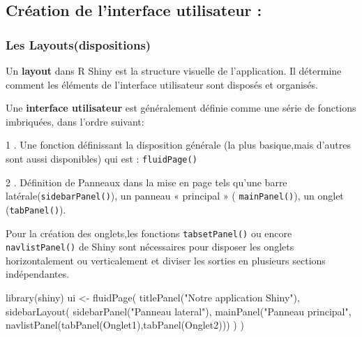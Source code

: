 \documentclass[
]{article}
\newenvironment{Shaded}{\begin{snugshade}}{\end{snugshade}}
\newcommand{\FunctionTok}[1]{\textcolor[rgb]{0.00,0.00,0.00}{#1}}
\newcommand{\NormalTok}[1]{#1}
\newcommand{\OtherTok}[1]{\textcolor[rgb]{0.56,0.35,0.01}{#1}}
\newcommand{\StringTok}[1]{\textcolor[rgb]{0.31,0.60,0.02}{#1}}
\begin{document}
\hypertarget{cruxe9ation-de-linterface-utilisateur}{%
\subsection{Création de l'interface utilisateur
:}\label{cruxe9ation-de-linterface-utilisateur}}

\hypertarget{les-layoutsdispositions}{%
\subsubsection{Les
Layouts(dispositions)}\label{les-layoutsdispositions}}

Un \textbf{layout} dans R Shiny est la structure visuelle de
l'application. Il détermine comment les éléments de l'interface
utilisateur sont disposés et organisés.

Une \textbf{interface utilisateur} est généralement définie comme une
série de fonctions imbriquées, dans l'ordre suivant:

1 . Une fonction définissant la disposition générale (la plus
basique,mais d'autres sont aussi disponibles) qui est :
\texttt{fluidPage()}

2 . Définition de Panneaux dans la mise en page tels qu'une barre
latérale(\texttt{sidebarPanel()}), un panneau « principal » (
\texttt{mainPanel()}), un onglet (\texttt{tabPanel()}).

Pour la création des onglets,les fonctions \texttt{tabsetPanel()} ou
encore \texttt{navlistPanel()} de Shiny sont nécessaires pour disposer
les onglets horizontalement ou verticalement et diviser les sorties en
plusieurs sections indépendantes.

\begin{Shaded}
\begin{Highlighting}[]
\FunctionTok{library}\NormalTok{(shiny)}
\NormalTok{ui }\OtherTok{\textless{}{-}} \FunctionTok{fluidPage}\NormalTok{(}
  \FunctionTok{titlePanel}\NormalTok{(}\StringTok{"Notre application Shiny"}\NormalTok{),}
  \FunctionTok{sidebarLayout}\NormalTok{(}
  \FunctionTok{sidebarPanel}\NormalTok{(}\StringTok{"Panneau lateral"}\NormalTok{),}
\FunctionTok{mainPanel}\NormalTok{(}\StringTok{"Panneau principal"}\NormalTok{, }\FunctionTok{navlistPanel}\NormalTok{(}\FunctionTok{tabPanel}\NormalTok{(}\StringTok{\textquotesingle{}Onglet1\textquotesingle{}}\NormalTok{),}\FunctionTok{tabPanel}\NormalTok{(}\StringTok{\textquotesingle{}Onglet2\textquotesingle{}}\NormalTok{)))}
\NormalTok{               )}
\NormalTok{               )}
\end{Highlighting}
\end{Shaded}
\end{document}

